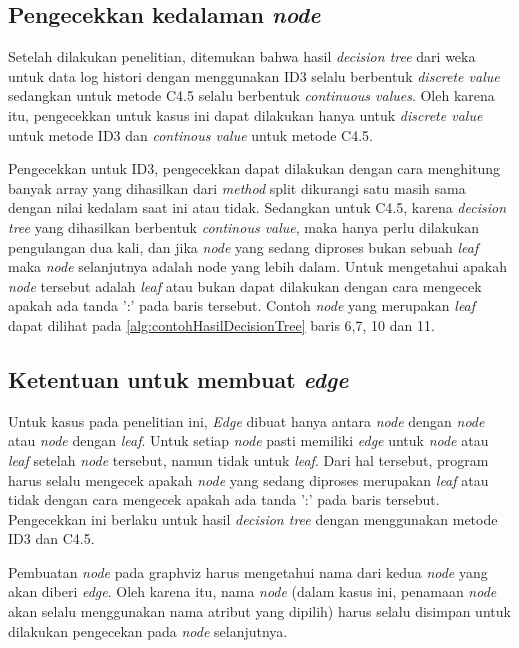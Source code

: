 \subsection{Pengecekkan kedalaman \textsl{node}}

Setelah dilakukan penelitian, ditemukan bahwa hasil \textsl{decision tree} dari weka untuk data log histori dengan menggunakan ID3 selalu berbentuk \textsl{discrete value} sedangkan untuk metode C4.5 selalu berbentuk \textsl{continuous values}. Oleh karena itu, pengecekkan untuk kasus ini dapat dilakukan hanya untuk \textsl{discrete value} untuk metode ID3 dan \textsl{continous value} untuk metode C4.5.

Pengecekkan untuk ID3, pengecekkan dapat dilakukan dengan cara menghitung banyak array yang dihasilkan dari \textsl{method} split dikurangi satu masih sama dengan nilai kedalam saat ini atau tidak. Sedangkan untuk C4.5, karena \textsl{decision tree} yang dihasilkan berbentuk \textsl{continous value}, maka hanya perlu dilakukan pengulangan dua kali, dan jika \textsl{node} yang sedang diproses bukan sebuah \textsl{leaf} maka \textsl{node} selanjutnya adalah node yang lebih dalam. Untuk mengetahui apakah \textsl{node} tersebut adalah \textsl{leaf} atau bukan dapat dilakukan dengan cara mengecek apakah ada tanda ':' pada baris tersebut. Contoh \textsl{node} yang merupakan \textsl{leaf} dapat dilihat pada \ref{alg:contohHasilDecisionTree} baris 6,7, 10 dan 11.

\subsection{Ketentuan untuk membuat \textsl{edge}}

Untuk kasus pada penelitian ini, \textsl{Edge} dibuat hanya antara \textsl{node} dengan \textsl{node} atau \textsl{node} dengan \textsl{leaf}. Untuk setiap \textsl{node} pasti memiliki \textsl{edge} untuk \textsl{node} atau \textsl{leaf} setelah \textsl{node} tersebut, namun tidak untuk \textsl{leaf}. Dari hal tersebut, program harus selalu mengecek apakah \textsl{node} yang sedang diproses merupakan \textsl{leaf} atau tidak dengan cara mengecek apakah ada tanda ':' pada baris tersebut. Pengecekkan ini berlaku untuk hasil \textsl{decision tree} dengan menggunakan metode ID3 dan C4.5.

Pembuatan \textsl{node} pada graphviz harus mengetahui nama dari kedua \textsl{node} yang akan diberi \textsl{edge}. Oleh karena itu, nama \textsl{node} (dalam kasus ini, penamaan \textsl{node} akan selalu menggunakan nama atribut yang dipilih) harus selalu disimpan untuk dilakukan pengecekan pada \textsl{node} selanjutnya. 

